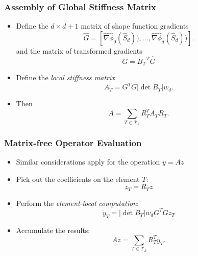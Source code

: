 \documentclass[aspectratio=169,11pt]{beamer}
\theoremstyle{definition}
\begin{document}
\begin{frame}
\frametitle{Assembly of Global Stiffness Matrix}
\begin{itemize}
\item Define the $d\times d+1$ matrix of shape function gradients
\begin{equation*}
\hat G = \left[\hat\nabla\hat\phi_0(\hat S_d)),\ldots,\hat\nabla\hat\phi_d(\hat S_d))\right] .
\end{equation*}
and the matrix of transformed gradients $$G=B_T^{-T} \hat G$$
\item Define the {\em local stiffness matrix}
\begin{equation*}
A_T = G^T G |\det B_T| w_d .
\end{equation*}
\item Then
\begin{equation*}
A =  \sum_{T\in\mathcal{T}_h} R_T^T A_T R_T .
\end{equation*}
\end{itemize}
\end{frame}

\begin{frame}
\frametitle{Matrix-free Operator Evaluation}
\begin{itemize}
\item Similar considerations apply for the operation $y=Az$
\item Pick out the coefficients on the element $T$:
$$z_T = R_T z$$
\item Perform the {\em element-local computation}:
\begin{equation*}
y_T = |\det B_T| w_d G^T G z_T
\end{equation*}
\item Accumulate the results:
\begin{equation*}
Az =  \sum_{T\in\mathcal{T}_h} R_T^T y_T.
\end{equation*}
\end{itemize}
\end{frame}
\end{document}
